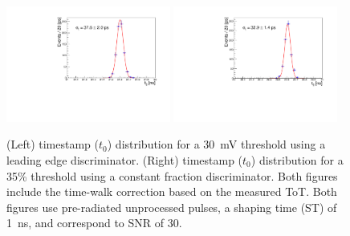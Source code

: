 \documentclass[preprint,1p]{elsarticle}
\begin{document}
  \begin{figure}[htbp]
    \centering
    \includegraphics[width=0.48\textwidth]{figs/pre_rad_st_1ns_snr_30_le_tot_threshold_30mV.pdf} \hfill
    \includegraphics[width=0.48\textwidth]{figs/pre_rad_st_1ns_snr_30_cfd_tot_threshold_35_percent_v2.pdf}
    \caption{(Left) timestamp ($t_{0}$) distribution for a 30~\si{mV} threshold using a leading edge discriminator.
    (Right) timestamp ($t_{0}$) distribution for a 35\% threshold using a constant fraction discriminator. Both figures
    include the time-walk correction based on the measured ToT.
    Both figures use pre-radiated unprocessed pulses, a shaping time (ST) of 1~\si{ns}, and correspond to SNR of 30.}
    \label{fig:time_res}
  \end{figure}
\end{document}
